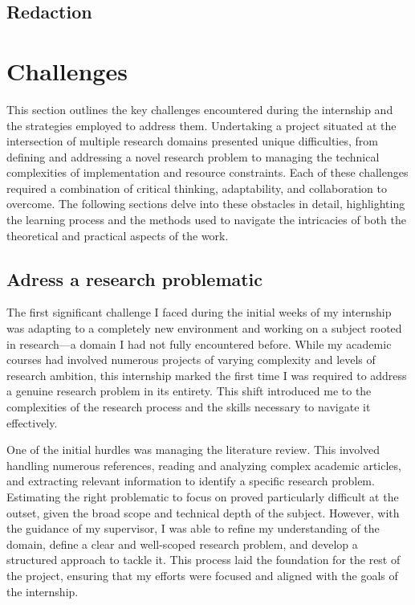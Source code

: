 \subsection{Redaction}
\label{sec:redaction}




\section{Challenges}
\label{sec:challenge}

This section outlines the key challenges encountered during the internship and the strategies employed to address them. Undertaking a project situated at the intersection of multiple research domains presented unique difficulties, from defining and addressing a novel research problem to managing the technical complexities of implementation and resource constraints. Each of these challenges required a combination of critical thinking, adaptability, and collaboration to overcome. The following sections delve into these obstacles in detail, highlighting the learning process and the methods used to navigate the intricacies of both the theoretical and practical aspects of the work.



\subsection{Adress a research problematic}
\label{sec:adress_research}
The first significant challenge I faced during the initial weeks of my internship was adapting to a completely new environment and working on a subject rooted in research—a domain I had not fully encountered before. While my academic courses had involved numerous projects of varying complexity and levels of research ambition, this internship marked the first time I was required to address a genuine research problem in its entirety. This shift introduced me to the complexities of the research process and the skills necessary to navigate it effectively.

One of the initial hurdles was managing the literature review. This involved handling numerous references, reading and analyzing complex academic articles, and extracting relevant information to identify a specific research problem. Estimating the right problematic to focus on proved particularly difficult at the outset, given the broad scope and technical depth of the subject. However, with the guidance of my supervisor, I was able to refine my understanding of the domain, define a clear and well-scoped research problem, and develop a structured approach to tackle it. This process laid the foundation for the rest of the project, ensuring that my efforts were focused and aligned with the goals of the internship.


